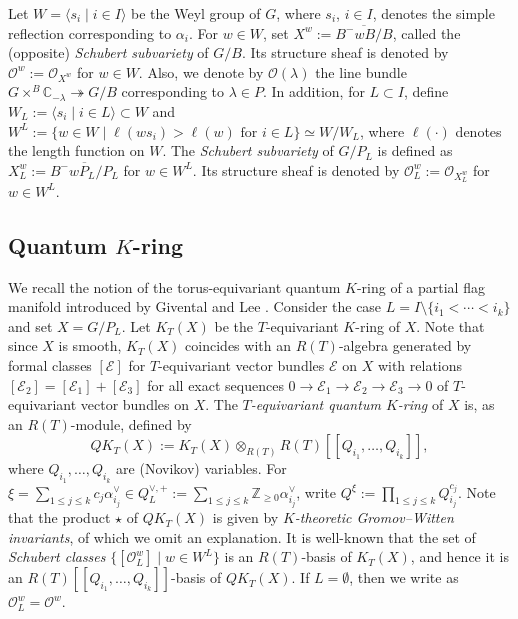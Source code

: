 \documentclass[a4paper, 11pt, reqno]{amsart}
\numberwithin{equation}{section}
\newcommand{\BZ}{\mathbb{Z}}
\newcommand{\BC}{\mathbb{C}}
\newcommand{\CE}{\mathcal{E}}
\newcommand{\CO}{\mathcal{O}}
\newcommand{\bra}[1]{[\![ #1 ]\!]}
\theoremstyle{plain}
\theoremstyle{definition}
\theoremstyle{remark}
\begin{document}
Let $W = \langle s_{i} \mid i \in I \rangle$ be the Weyl group of $G$, where $s_{i}$, $i \in I$, denotes the simple reflection corresponding to $\alpha_{i}$. 
For $w \in W$, set $X^{w} := \overline{B^{-}wB/B}$, called the (opposite) \emph{Schubert subvariety} of $G/B$. 
Its structure sheaf is denoted by $\CO^{w} := \CO_{X^{w}}$ for $w \in W$. 
Also, we denote by $\CO(\lambda)$ the line bundle $G \times^{B} \BC_{-\lambda} \twoheadrightarrow G/B$ corresponding to $\lambda \in P$. 
In addition, for $L \subset I$, define $W_{L} := \langle s_{i} \mid i \in L \rangle \subset W$ and $W^{L} := \{ w \in W \mid \text{$\ell(ws_{i}) > \ell(w)$ for $i \in L$} \} \simeq W/W_{L}$, where $\ell(\cdot)$ denotes the length function on $W$. The \emph{Schubert subvariety} of $G/P_{L}$ is defined as $X_{L}^{w} := \overline{B^{-}wP_{L}/P_{L}}$ for $w \in W^{L}$. Its structure sheaf is denoted by $\CO_{L}^{w} := \CO_{X_{L}^{w}}$ for $w \in W^{L}$. 

\subsection{\texorpdfstring{Quantum $K$-ring}{Quantum K-ring}}
We recall the notion of the torus-equivariant quantum $K$-ring of a partial flag manifold introduced by Givental \cite{Givental} and Lee \cite{Lee}. 
Consider the case $L = I \setminus \{i_{1} < \cdots < i_{k}\}$ and set $X = G/P_{L}$. 
Let $K_{T}(X)$ be the $T$-equivariant $K$-ring of $X$. 
Note that since $X$ is smooth, $K_{T}(X)$ coincides with an $R(T)$-algebra generated by formal classes $[\CE]$ for $T$-equivariant vector bundles $\CE$ on $X$ with relations $[\CE_{2}] = [\CE_{1}] + [\CE_{3}]$ for all exact sequences $0 \rightarrow \CE_{1} \rightarrow \CE_{2} \rightarrow \CE_{3} \rightarrow 0$ of $T$-equivariant vector bundles on $X$. 
The \emph{$T$-equivariant quantum $K$-ring} of $X$ is, as an $R(T)$-module, defined by 
\begin{equation}
QK_{T}(X) := K_{T}(X) \otimes_{R(T)} R(T)\bra{Q_{i_{1}}, \ldots, Q_{i_{k}}}, 
\end{equation}
where $Q_{i_{1}}, \ldots, Q_{i_{k}}$ are (Novikov) variables. For $\xi = \sum_{1 \le j \le k} c_{j} \alpha_{i_{j}}^{\vee} \in Q^{\vee, +}_{L} := \sum_{1 \le j \le k} \BZ_{\ge 0} \alpha_{i_{j}}^{\vee}$, write $Q^{\xi} := \prod_{1 \le j \le k} Q_{i_{j}}^{c_{j}}$. 
Note that the product $\star$ of $QK_{T}(X)$ is given by \emph{$K$-theoretic Gromov--Witten invariants}, of which we omit an explanation. 
It is well-known that the set of \emph{Schubert classes} $\{[\CO_{L}^{w}] \mid w \in W^{L}\}$ is an $R(T)$-basis of $K_{T}(X)$, and hence it is an $R(T)\bra{Q_{i_{1}}, \ldots, Q_{i_{k}}}$-basis of $QK_{T}(X)$. If $L = \emptyset$, then we write as $\CO^{w}_{L} = \CO^{w}$. 
\end{document}

